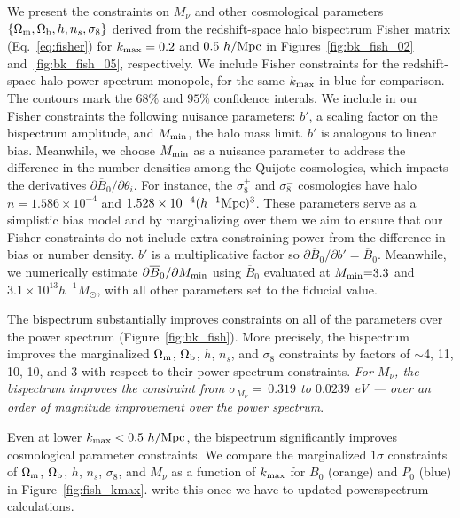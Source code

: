\documentclass[12pt, letterpaper, preprint]{aastex62}
\newcommand{\Om}{\Omega_{\rm m}}
\newcommand{\Ob}{\Omega_{\rm b}}
\newcommand{\smnu}{M_\nu}
\newcommand{\sig}{\sigma_8}
\newcommand{\ch}[1]{{\color{orange}{\bf CH:} #1}}
\begin{document}
We present the constraints on $\smnu$ and other cosmological parameters 
$\{\Om, \Ob, h, n_s, \sig\}$ derived from the redshift-space halo bispectrum 
Fisher matrix (Eq.~\ref{eq:fisher}) for $k_{\rm max} = 0.2$ and $0.5~h/{\rm Mpc}$ 
in Figures~\ref{fig:bk_fish_02} and~\ref{fig:bk_fish_05}, respectively. 
We include Fisher constraints for the redshift-space halo power spectrum 
monopole, for the same $k_{\rm max}$ in blue for comparison. The contours 
mark the $68\%$ and $95\%$ confidence interals. We include in our Fisher 
constraints the following nuisance parameters: $b'$, a scaling factor on the 
bispectrum amplitude, and $M_{\rm min}$, the halo mass limit. $b'$ is 
analogous to linear bias. Meanwhile, we choose $M_{\rm min}$ as a nuisance
parameter to address the difference in the number densities among the Quijote
cosmologies, which impacts the derivatives $\partial \overline{B}_0/\partial \theta_i$. 
For instance, the $\sig^{+}$ and $\sig^{-}$ cosmologies have halo 
$\bar{n} = 1.586\times10^{-4}$ and $1.528 \times 10^{-4}(h^{-1}{\rm Mpc})^3$. 
These parameters serve as a simplistic bias model and by marginalizing 
over them we aim to ensure that our Fisher constraints do not include extra 
constraining power from the difference in bias or number density. $b'$ is a 
multiplicative factor so $\partial \overline{B}_0/\partial b' = \overline{B}_0$. 
Meanwhile, we numerically estimate $\partial \overline{B}_0/\partial M_{\rm min}$ 
using $\overline{B}_0$ evaluated at $M_{\rm min}{=}3.3$ and 
$3.1\times10^{13}h^{-1}M_\odot$, with all other parameters set to the fiducial 
value. 

The bispectrum substantially improves constraints on all of the parameters 
over the power spectrum (Figure~\ref{fig:bk_fish}). 
More precisely, the bispectrum improves the marginalized $\Om$, $\Ob$, $h$, 
$n_s$, and $\sig$ constraints by factors of \ch{$\sim$4, 11, 10, 10, and 3} with 
respect to their power spectrum constraints. {\em For $\smnu$, the bispectrum 
improves the constraint from $\sigma_{\smnu}{=}~0.319$ to $0.0239$ eV --- over 
an order of magnitude improvement over the power spectrum}.

Even at lower $k_{\rm max} < 0.5~h/{\rm Mpc}$, the bispectrum significantly 
improves cosmological parameter constraints. We compare the marginalized 
$1\sigma$ constraints of $\Om$, $\Ob$, $h$, $n_s$, $\sig$, and $\smnu$ as 
a function of $k_{\rm max}$ for $B_0$ (orange) and $P_0$ (blue) in Figure~\ref{fig:fish_kmax}. 
\ch{write this once we have to updated powerspectrum calculations}. 
\end{document}
